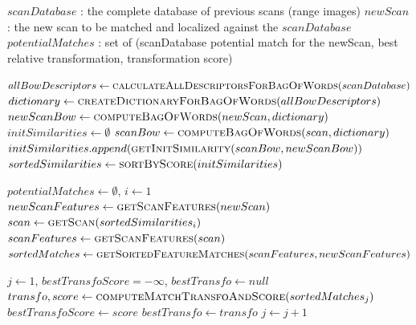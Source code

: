 \begin{algorithm}
    \begin{algorithmic}[1]
        \INPUT
        \Statex $scanDatabase$ : the complete database of previous scans (range images)
        \Statex $newScan$ : the new scan to be matched and localized against the $scanDatabase$
        \OUTPUT
        \Statex $potentialMatches$ : set of (scanDatabase potential match for the newScan, best relative transformation, transformation score)
        \Statex

        \State $allBowDescriptors \gets \textsc{calculateAllDescriptorsForBagOfWords}(scanDatabase)$ \label{alg:bow_beginning}
        \State $dictionary \gets \textsc{createDictionaryForBagOfWords}(allBowDescriptors)$ \label{alg:dictionary}
        \State
        \State $newScanBow \gets \textsc{computeBagOfWords}(newScan, dictionary)$  \label{alg:create_bow}
        \State \State $initSimilarities \gets \emptyset$ 
        \State $scanBow \gets \textsc{computeBagOfWords}(scan, dictionary)$ \label{alg:create_bow2}
        \State $initSimilarities.append(\textsc{getInitSimilarity}(scanBow, newScanBow))$ \label{alg:init_similarities}
        \EndFor
        \State $sortedSimilarities \gets \textsc{sortByScore}(initSimilarities)$ \label{alg:bow_end}

        \State
        \State $potentialMatches \gets \emptyset$, $i \gets 1$ \label{alg:correspondences_beginning}
        \State $newScanFeatures \gets \textsc{getScanFeatures}(newScan)$   \label{alg:features_1}
         \label{alg:timeout}
        \State $scan \gets \textsc{getScan}(sortedSimilarities_i)$
        \State $scanFeatures \gets \textsc{getScanFeatures}(scan)$  \label{alg:features_2}
        \State $sortedMatches \gets \textsc{getSortedFeatureMatches}(scanFeatures, newScanFeatures)$ \label{alg:ordered_matches}

        \State
        \State $j \gets 1$, $bestTransfoScore = -\infty$, $bestTransfo \gets null$
        \State $transfo,score \gets \textsc{computeMatchTransfoAndScore}(sortedMatches_j)$ \label{alg:transfo_score}
        \State $bestTransfoScore \gets score$
        \State $bestTransfo \gets transfo$
        \EndIf
        \State $j \gets j + 1$
        \EndWhile


\end{algorithmic}
\end{algorithm}
